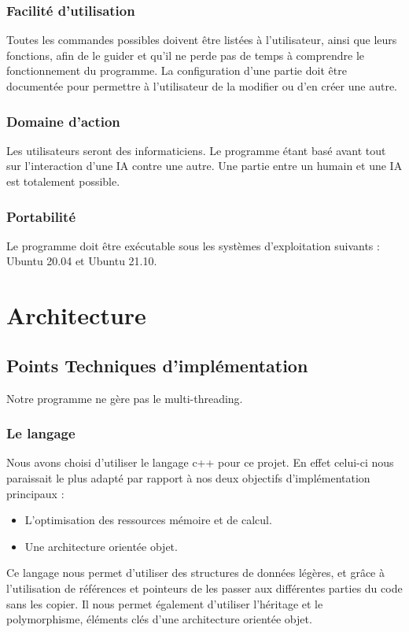 \huge\documentclass{article}
\begin{document}
\subsubsection{Facilité d'utilisation} 
Toutes les commandes possibles doivent être listées à l'utilisateur, ainsi que leurs fonctions, afin de le guider et qu'il ne perde pas de temps à comprendre le fonctionnement du programme.
La configuration d'une partie doit être documentée pour permettre à l'utilisateur de la modifier ou d'en créer une autre.
\medskip
\subsubsection{Domaine d'action} 
Les utilisateurs seront des informaticiens. Le programme étant basé avant tout sur l'interaction d'une IA contre une autre. 
Une partie entre un humain et une IA est totalement possible.
\medskip
\subsubsection{Portabilité} 
Le programme doit être exécutable sous les systèmes d'exploitation suivants : Ubuntu 20.04 et Ubuntu 21.10.

\newpage
\section{Architecture}

\subsection{Points Techniques d'implémentation}
Notre programme ne gère pas le multi-threading.

\subsubsection{Le langage}

Nous avons choisi d'utiliser le langage c++ pour ce projet. En effet celui-ci nous paraissait le plus adapté par rapport à nos deux objectifs d'implémentation principaux :
\begin{itemize}
    \item L'optimisation des ressources mémoire et de calcul.
    \item Une architecture orientée objet.
\end{itemize}
Ce langage nous permet d'utiliser des structures de données légères, et grâce à l'utilisation de références et pointeurs de les passer aux différentes parties du code sans les copier.
Il nous permet également d'utiliser l'héritage et le polymorphisme, éléments clés d'une architecture orientée objet.
\end{document}
